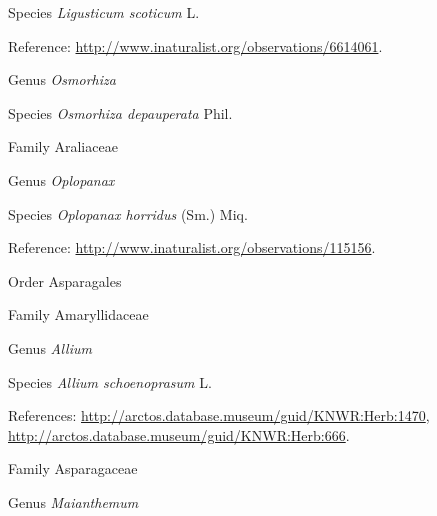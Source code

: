 \documentclass[9pt, article]{memoir}
\begin{document}
\begin{multicols}{2}
\vspace{6pt}\noindent\hspace{36pt}Species \textit{Ligusticum scoticum} L.


\vspace{6pt}Reference: 
\url{http://www.inaturalist.org/observations/6614061}.

\vspace{6pt}\noindent\hspace{30pt}Genus \textit{Osmorhiza}


\vspace{6pt}\noindent\hspace{36pt}Species \textit{Osmorhiza depauperata} Phil.


\vspace{6pt}\noindent\hspace{24pt}Family Araliaceae


\vspace{6pt}\noindent\hspace{30pt}Genus \textit{Oplopanax}


\vspace{6pt}\noindent\hspace{36pt}Species \textit{Oplopanax horridus} (Sm.) Miq.


\vspace{6pt}Reference: 
\url{http://www.inaturalist.org/observations/115156}.

\vspace{6pt}\noindent\hspace{18pt}Order Asparagales


\vspace{6pt}\noindent\hspace{24pt}Family Amaryllidaceae


\vspace{6pt}\noindent\hspace{30pt}Genus \textit{Allium}


\vspace{6pt}\noindent\hspace{36pt}Species \textit{Allium schoenoprasum} L.


\vspace{6pt}References: 
\url{http://arctos.database.museum/guid/KNWR:Herb:1470}, 
\url{http://arctos.database.museum/guid/KNWR:Herb:666}.

\vspace{6pt}\noindent\hspace{24pt}Family Asparagaceae


\vspace{6pt}\noindent\hspace{30pt}Genus \textit{Maianthemum}



\end{multicols}
\end{document}
